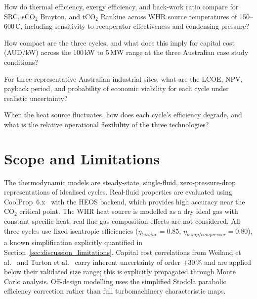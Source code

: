 \bigskip
\begin{description}[leftmargin=1.5em,style=nextline]
\item[\textbf{RQ1 --- Thermodynamic Performance:}]
How do thermal efficiency, exergy efficiency, and back-work ratio compare
for SRC, sCO$_2$ Brayton, and tCO$_2$ Rankine across WHR source temperatures
of 150--600\,\textdegree C, including sensitivity to recuperator effectiveness
and condensing pressure?

\item[\textbf{RQ2 --- System Compactness and Capital Cost:}]
How compact are the three cycles, and what does this imply for capital cost
(AUD/kW) across the 100\,kW to 5\,MW range at the three Australian case
study conditions?

\item[\textbf{RQ3 --- Australian Techno-Economic Analysis:}]
For three representative Australian industrial sites, what are the LCOE, NPV,
payback period, and probability of economic viability for each cycle under
realistic uncertainty?

\item[\textbf{RQ4 --- Off-Design and Part-Load Performance:}]
When the heat source fluctuates, how does each cycle's efficiency degrade,
and what is the relative operational flexibility of the three technologies?
\end{description}

\section{Scope and Limitations}
\label{sec:scope}

The thermodynamic models are steady-state, single-fluid, zero-pressure-drop
representations of idealised cycles. Real-fluid properties are evaluated using
CoolProp~6.x~\cite{Bell2014} with the HEOS backend, which provides high
accuracy near the CO$_2$ critical point. The WHR heat source is modelled as a
dry ideal gas with constant specific heat; real flue gas composition effects
are not considered. All three cycles use fixed isentropic efficiencies
($\eta_{turbine} = 0.85$, $\eta_{pump/compressor} = 0.80$), a known
simplification explicitly quantified in Section~\ref{sec:discussion_limitations}. Capital
cost correlations from Weiland et al.~\cite{Weiland2019} and Turton et
al.~\cite{Turton2012} carry inherent uncertainty of order $\pm$30\,\% and are
applied below their validated size range; this is explicitly propagated
through Monte Carlo analysis. Off-design modelling
uses the simplified Stodola parabolic efficiency correction rather than
full turbomachinery characteristic maps.

